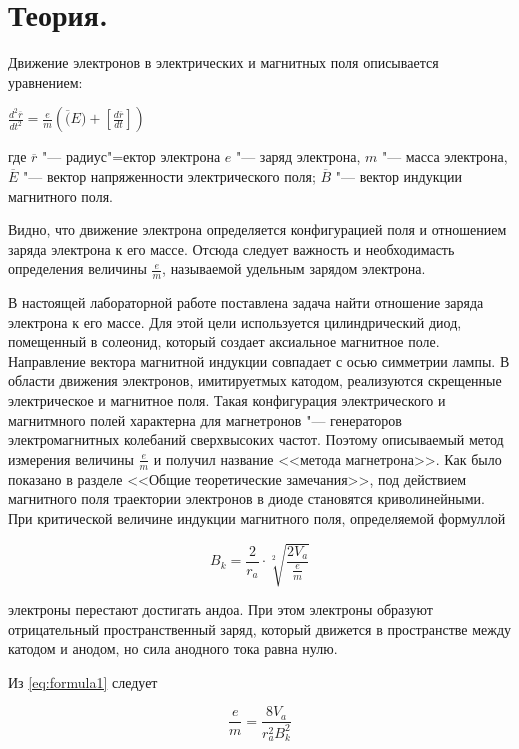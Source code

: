 \section{Теория.}

Движение электронов в электрических и магнитных поля описывается уравнением:

$ \frac{d^2 \overline{r}}{dt^2} = \frac{e}{m} \left ( \overline(E) + \left [ \frac{d \overline{r}}{dt} \right ] \right )$

где $\overline{r}$ "--- радиус"=ектор электрона $e$ "--- заряд электрона, $m$ "--- масса электрона, $\overline{E}$ "--- вектор напряженности электрического поля; $\overline{B}$ "--- вектор индукции магнитного поля.

Видно, что движение электрона определяется конфигурацией поля и отношением заряда электрона к его массе. Отсюда следует важность и необходимасть определения величины $\frac{e}{m}$, называемой удельным зарядом электрона.

В настоящей лабораторной работе поставлена задача найти отношение заряда электрона к его массе. Для этой цели используется цилиндрический диод, помещенный в солеонид, который создает аксиальное магнитное поле. Направление вектора магнитной индукции совпадает с осью симметрии лампы. В области движения электронов, имитируетмых катодом, реализуются скрещенные электрическое и магнитное поля. Такая конфигурация электрического и магнитмного полей характерна для магнетронов "--- генераторов электромагнитных колебаний сверхвысоких частот. Поэтому описываемый метод измерения величины $\frac{e}{m}$ и получил название <<метода магнетрона>>. Как было показано в разделе <<Общие теоретические замечания>>, под действием магнитного поля траектории электронов в диоде становятся криволинейными. При критической величине индукции магнитного поля, определяемой формуллой

\begin{equation}
    B_k = \frac{2}{r_a} \cdot \sqrt[2]{\frac{2 V_a}{\frac{e}{m}}}
    \label{eq:formula1}
\end{equation}

электроны перестают достигать андоа. При этом электроны образуют отрицательный пространственный заряд, который движется в пространстве между катодом и анодом, но сила анодного тока равна нулю.

Из \ref{eq:formula1} следует

\begin{equation}
    \frac{e}{m} = \frac{8 V_a}{r^2_a B^2_k}
    \label{eq:formula2}
\end{equation}

